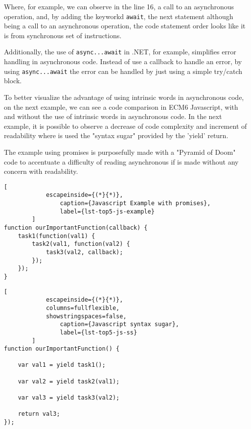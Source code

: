 	Where, for example, we can observe in the line 16, a call to an asynchronous operation, and, by adding the keyworkd \texttt{await}, the next statement although being a call to an asynchronous operation, the code statement order looks like it is from synchronous set of instructions. 
	
	Additionally, the use of \texttt{async...await} in .NET, for example, simplifies error handling in asynchronous code. Instead of use a callback to handle an error, by using \texttt{async...await} the error can be handled by just using a simple try/catch block. 

	
	To better visualize the advantage of using intrinsic words in asynchronous code, on the next example, we can see a code comparison in ECM6 Javascript, with and without the use of intrinsic words in asynchronous code. 
	In the next example, it is possible to observe a decrease of code complexity and increment of readability where is used the "syntax sugar" provided by the 'yield' return. 
	
	The example using promises is purposefully made with a "Pyramid of Doom" code to accentuate a difficulty of reading asynchronous if is made without any concern with readability.
	
	\begin{center}
		\lstset{basicstyle=\scriptsize\ttfamily,frame=bottomline}
		\begin{minipage}[t][][b]{.46\textwidth}
		\begin{lstlisting}[
			escapeinside={(*}{*)},
				caption={Javascript Example with promises},
				label={lst-top5-js-example}
		]
function ourImportantFunction(callback) {
	task1(function(val1) {
		task2(val1, function(val2) {
			task3(val2, callback);
		});
	});
}
		\end{lstlisting}
		\end{minipage}
		\hfill
		\begin{minipage}{.48\textwidth}
		\lstset{basicstyle=\scriptsize\ttfamily,frame=bottomline}
		\begin{lstlisting}[
			escapeinside={(*}{*)},
			columns=fullflexible,
			showstringspaces=false,
				caption={Javascript syntax sugar},
				label={lst-top5-js-ss}
		]
function ourImportantFunction() {
	
	var val1 = yield task1();
	
	var val2 = yield task2(val1);
	
	var val3 = yield task3(val2);

	return val3;
});

		\end{lstlisting}
		\end{minipage}
	\end{center}

